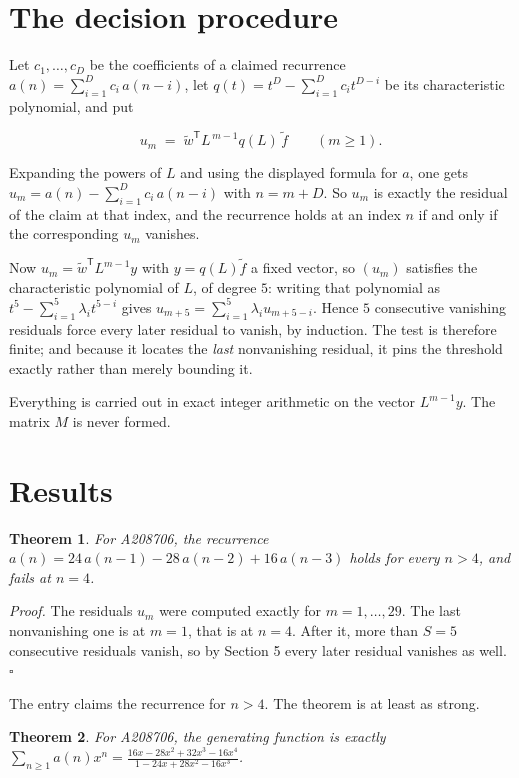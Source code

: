 \documentclass[11pt]{article}
\newtheorem{theorem}{Theorem}
\theoremstyle{definition}
\begin{document}
\section{The decision procedure}

Let $c_1,\dots,c_D$ be the coefficients of a claimed recurrence $a(n) = \sum_{i=1}^{D} c_i\,a(n-i)$, let $q(t) = t^{D} - \sum_{i=1}^{D} c_i t^{D-i}$ be its characteristic polynomial, and put

\[u_m \;=\; \tilde w^{\mathsf T} L^{\,m-1} q(L)\,\tilde f \qquad (m \ge 1).\]

Expanding the powers of $L$ and using the displayed formula for $a$, one gets $u_m = a(n) - \sum_{i=1}^{D} c_i\,a(n-i)$ with $n = m + D$. So $u_m$ is exactly the residual of the claim at that index, and the recurrence holds at an index $n$ if and only if the corresponding $u_m$ vanishes.

Now $u_m = \tilde w^{\mathsf T} L^{m-1} y$ with $y = q(L)\tilde f$ a fixed vector, so $(u_m)$ satisfies the characteristic polynomial of $L$, of degree $5$: writing that polynomial as $t^{5} - \sum_{i=1}^{5} \lambda_i t^{5-i}$ gives $u_{m+5} = \sum_{i=1}^{5} \lambda_i u_{m+5-i}$. Hence $5$ consecutive vanishing residuals force every later residual to vanish, by induction. The test is therefore finite; and because it locates the {\itshape last} nonvanishing residual, it pins the threshold exactly rather than merely bounding it.

Everything is carried out in exact integer arithmetic on the vector $L^{m-1}y$. The matrix $M$ is never formed.

\section{Results}

\begin{theorem} For A208706, the recurrence $a(n) = 24\,a(n-1) - 28\,a(n-2) + 16\,a(n-3)$ holds for every $n > 4$, and fails at $n = 4$.\end{theorem}

{\itshape Proof.} The residuals $u_m$ were computed exactly for $m = 1,\dots,29$. The last nonvanishing one is at $m = 1$, that is at $n = 4$. After it, more than $S = 5$ consecutive residuals vanish, so by Section 5 every later residual vanishes as well. $\square$

The entry claims the recurrence for $n > 4$. The theorem is at least as strong.

\begin{theorem} For A208706, the generating function is exactly $\sum_{n\ge 1} a(n)x^n = \frac{16x - 28x^{2} + 32x^{3} - 16x^{4}}{1 - 24x + 28x^{2} - 16x^{3}}$.\end{theorem}
\end{document}

